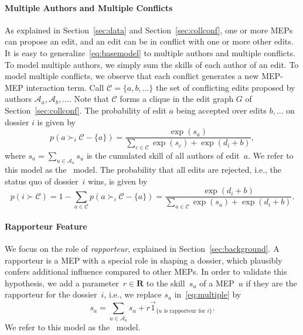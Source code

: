 \paragraph{Multiple Authors and Multiple Conflicts}
As explained in Section~\ref{sec:data} and Section~\ref{sec:collconf}, one or more MEPs can propose an edit, and an edit can be in conflict with one or more other edits.
It is easy to generalize~\eqref{eq:basemodel} to multiple authors and multiple conflicts.
To model multiple authors, we simply sum the skills of each author of an edit.
To model multiple conflicts, we observe that each conflict generates a new MEP-MEP interaction term.
Call \mbox{$\mathcal{C} = \{ a, b, \dots \}$} the set of conflicting edits proposed by authors $ \mathcal{A}_a, \mathcal{A}_b, \dots $.
Note that $ \mathcal{C} $ forms a clique in the edit graph $ G $ of Section~\ref{sec:collconf}.
The probability of edit $a$ being accepted over edits $b, \dots$ on dossier $i$ is given by
\begin{equation}
	\label{eq:multiple}
	p\left( a \succ_i \mathcal{C} - \{ a\} \right) =
	\frac{\exp(s_a) }{ \sum\limits_{c \in \mathcal{C} } \exp(s_c) + \exp(d_i + b) },
\end{equation}
where $s_a = \sum_{u \in \mathcal{A}_a} s_u$ is the cumulated skill of all authors of edit~$a$.
We refer to this model as the \wow\ model.
The probability that all edits are rejected, i.e., the status quo of dossier~$i$ wins, is given by
\begin{equation*}
	p\left(i \succ \mathcal{C} \right)
	= 1 - \sum_{a \in \mathcal{C} } p( a \succ_i \mathcal{C} - \{ a \})
	= \frac{\exp(d_i + b) }{ \sum\limits_{a \in \mathcal{C} } \exp(s_a) + \exp(d_i + b) }.
\end{equation*}


\paragraph{Rapporteur Feature}
We focus on the role of \textit{rapporteur}, explained in Section~\ref{sec:background}.
A rapporteur is a MEP with a special role in shaping a dossier, which plausibly confers additional influence compared to other MEPs.
In order to validate this hypothesis, we add a parameter~$r \in \mathbf{R}$ to the skill~$s_u$ of a MEP~$u$ if they are the rapporteur for the dossier~$i$, i.e., we replace $s_a$ in~\eqref{eq:multiple} by
\begin{equation*}
	s_a = \sum_{u \in \mathcal{A}_a} s_u + r\vec{1}_{\{u \text{ is rapporteur for } i\}}.
\end{equation*}
We refer to this model as the \wowr\ model.

